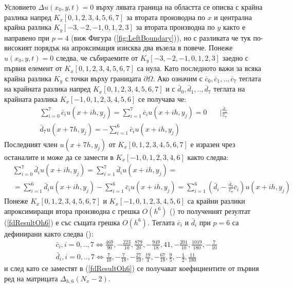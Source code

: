 \documentclass{article}
\newcommand{\rf}[1]{(\ref{#1})}
\begin{document}
Условието $\Delta u(x_0, y, t) = 0$ върху лявата граница на областта се описва с крайна разлика напред $K_x[0,1,2,3,4,5,6,7]$ за втората производна по $x$ и централна крайна разлика $K_y[-3,-2,-1,0,1,2,3]$ за втората производна по $y$ както е направено при $p=4$ (виж Фигура \rf{fig:LeftBoundary}), но с разликата че тук по-високият порядък на апроксимация изисква два възела в повече. Понеже $u(x_0, y, t) = 0$ следва, че събираемите от $K_y[-3,-2,-1,0,1,2,3]$ заедно с първия елемент от $K_x[0,1,2,3,4,5,6,7]$ са нула. Като последното важи за всяка крайна разлика $K_y$ с точки върху границата $\partial \Omega$. Ако означим с $\bar c_0, \bar c_1, .., \bar c_7$ теглата на крайната разлика напред $K_x[0,1,2,3,4,5,6,7]$ и с $\bar d_0, \bar d_1,.., \bar d_7$ теглата на крайната разлика $K_x[-1,0,1,2,3,4,5,6]$ се получава че:
\begin{align}\label{deltaOh6Zero}
\sum\limits_{i=0}^{7} \bar c_i u(x+ih, y_j) = \sum\limits_{i=1}^{7} \bar c_i u(x+ih, y_j) = 0 &  \quad | \frac{\bar d_7}{\bar c_7} \nonumber\\
\bar d_7 u(x+7h, y_j) = -\sum\limits_{i=1}^{6} \bar c_i u(x+ih, y_j) & 
\end{align}
Последният член $u(x+7h, y_j)$ от $K_x[0,1,2,3,4,5,6,7]$ е изразен чрез останалите и може да се замести в $K_x[-1,0,1,2,3,4,6]$ както следва:
\begin{align}\label{fdResultOh6}
&\sum\limits_{i=0}^{7} \bar d_i u(x+ih, y_j) = \sum\limits_{i=1}^{7} \bar d_i u(x+ih, y_j)  =  \\
&= \sum\limits_{i=1}^{6} \bar d_i u(x+ih, y_j) -\sum\limits_{i=1}^{6} \bar c_i u(x+ih, y_j) = \sum\limits_{i=1}^{6} \left( \bar d_i - \frac{\bar d_7}{\bar c_7} \bar c_i \right) u(x+ih, y_j) \nonumber
\end{align}
Понеже $K_x[0,1,2,3,4,5,6,7]$ и $K_x[-1,0,1,2,3,4,5,6]$ са крайни разлики апроксимиращи втора производна с грешка $O(h^6)$ (\cite{forn}) то полученият резултат \rf{fdResultOh6} е със същата грешка $O(h^6)$. Теглата $\bar c_i$ и $\bar d_i$ при $p=6$ са дефинирани както следва (\cite{forn}):
\begin{align}
&\bar c_i, i = 0,..,7 \iff \frac{469}{90}, -\frac{223}{10}, \frac{879}{20}, -\frac{949}{18}, 41, -\frac{201}{10}, \frac{1019}{180}, -\frac{7}{10} \\
&\bar d_i, i = 0,..,7 \iff \frac{7}{10}, -\frac{7}{18}, -\frac{27}{10}, \frac{19}{4}, -\frac{67}{18}, \frac{9}{5}, -\frac{1}{2}, \frac{11}{180}
\end{align}
и след като се заместят в \rf{fdResultOh6} се получават коефициентите от първия ред на матрицата $\Delta_{h,6}(N_x-2)$. 
\end{document}
